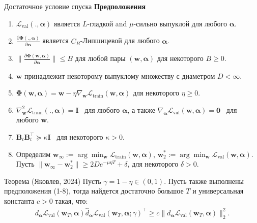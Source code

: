 \documentclass[aspectratio=169]{beamer}
\def\ltrn{\mathcal{L}_{\mathrm{train}}}
\def\lval{\mathcal{L}_{\mathrm{val}}}
\newcommand{\vect}[1]{\boldsymbol{\mathbf{#1}}}
\begin{document}
\begin{frame}{Достаточное условие спуска}
  \textbf{Предположения}
  \begin{enumerate}
    \item $\lval(., \vect{\alpha})$ является $L$-гладкой and $\mu$-сильно выпуклой для любого $\vect{\alpha}$.
   \item $\frac{\partial\vect{\Phi}(., \vect{\alpha})}{\partial\vect{\alpha}}$ является $C_B$-Липшицевой для любого $\vect{\alpha}$.
   \item $\|\frac{\partial\vect{\Phi}(\vect{w}, \vect{\alpha})}{\partial\vect{\alpha}}\| \leq B$ для любой пары $(\vect{w}, \vect{\alpha})$ для некоторого $B \geq 0$.
   \item $\vect{w}$ принадлежит некоторому выпуклому множеству с диаметром $D < \infty$.
   \item $\vect{\Phi}(\vect{w}, \vect{\alpha}) = \vect{w} - \eta\nabla_{\vect{w}}\ltrn(\vect{w}, \vect{\alpha})$ для некоторого $\eta \geq 0$.
   \item $\nabla^2_{\vect{w}}\ltrn(., \vect{\alpha}) = \vect{I}$ \, для любого $\vect{\alpha}$, а также $\nabla_{\vect{\alpha}}\lval(\vect{w}, \vect{\alpha}) = \vect{0}$ \, для любого $\vect{w}$.
   \item $\vect{B}_t\vect{B}_t^\top \succeq \kappa \vect{I}$ \, для некоторого $\kappa > 0$. 
   \item Определим $\vect{w}_{\infty} := \arg\min_{\vect{w}}\ltrn(\vect{w}, \vect{\alpha})$, $\vect{w}^*_2 := \arg\min_{\vect{w}}\lval(\vect{w}, \vect{\alpha})$. Пусть $\|\vect{w}_{\infty} - \vect{w}_2^*\| \geq 2De^{-\mu\eta T} + \delta$, для некоторого $\delta > 0$. 
\end{enumerate}

  \begin{block}{Теорема (Яковлев, 2024)}
  Пусть $\gamma = 1 - \eta \in (0, 1)$. Пусть также выполнены предположения (1-8), тогда найдется достаточно большое $T$ и универсальная константа $c > 0$ такая, что:
  \begin{align*}
      d_{\vect{\alpha}}\lval(\vect{w}_T, \vect{\alpha}) \hat{d}_{\vect{\alpha}}\lval(\vect{w}_T, \vect{\alpha}; \gamma)^\top \geq c \|d_{\vect{\alpha}}\lval(\vect{w}_T, \vect{\alpha})\|_2^2.
  \end{align*}
\end{block}
  
\end{frame}
\end{document}
